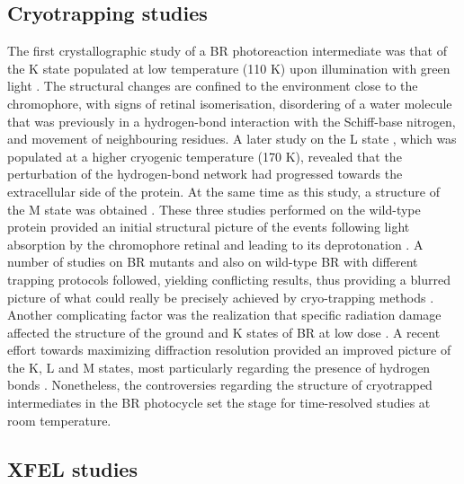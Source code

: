 \subsection{Cryotrapping studies}

The first crystallographic study of a BR photoreaction intermediate was that of the K state populated at low temperature (110 K) upon illumination with green light \parencite{edmanHighresolutionXrayStructure1999}. The structural changes are confined to the environment close to the chromophore, with signs of retinal isomerisation, disordering of a water molecule that was previously in a hydrogen-bond interaction with the Schiff-base nitrogen, and movement of neighbouring residues. A later study on the L state \parencite{royantHelixDeformationCoupled2000}, which was populated at a higher cryogenic temperature (170 K), revealed that the perturbation of the hydrogen-bond network had progressed towards the extracellular side of the protein. At the same time as this study, a structure of the M state was obtained \parencite{sassStructuralAlterationsProton2000}. These three studies performed on the wild-type protein provided an initial structural picture of the events following light absorption by the chromophore retinal and leading to its deprotonation \parencite{kuhlbrandtBacteriorhodopsinMovie2000}. A number of studies on BR mutants and also on wild-type BR with different trapping protocols followed, yielding conflicting results, thus providing a blurred picture of what could really be precisely achieved by cryo-trapping methods \parencite{wickstrandBacteriorhodopsinWouldReal2015}. Another complicating factor was the realization that specific radiation damage affected the structure of the ground and K states of BR at low dose \parencite{matsuiSpecificDamageInduced2002, borshchevskiyXrayRadiationInducedChangesBacteriorhodopsin2011, borshchevskiyLowdoseXrayRadiation2014}. A recent effort towards maximizing diffraction resolution provided an improved picture of the K, L and M states, most particularly regarding the presence of hydrogen bonds \parencite{borshchevskiyTrueatomicresolutionInsightsStructure2022}. Nonetheless, the controversies regarding the structure of cryotrapped intermediates in the BR photocycle set the stage for time-resolved studies at room temperature.

\subsection{XFEL studies}

